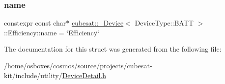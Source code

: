 \subsubsection{\texorpdfstring{name}{name}}
{\footnotesize\ttfamily constexpr const char$\ast$ \hyperlink{structcubesat_1_1__Device}{cubesat\+::\+\_\+\+Device}$<$ Device\+Type\+::\+B\+A\+TT $>$\+::Efficiency\+::name = \char`\"{}Efficiency\char`\"{}\hspace{0.3cm}{\ttfamily [static]}}



The documentation for this struct was generated from the following file\+:\begin{DoxyCompactItemize}
\item 
/home/osboxes/cosmos/source/projects/cubesat-\/kit/include/utility/\hyperlink{DeviceDetail_8h}{Device\+Detail.\+h}\end{DoxyCompactItemize}
